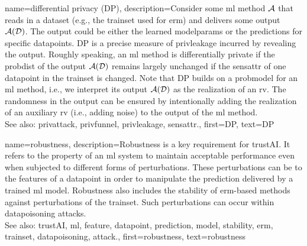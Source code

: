{name={differential privacy (DP)},
  description={Consider some \gls{ml} method $\mathcal{A}$ 
  	that reads in a \gls{dataset} (e.g., the \gls{trainset} 
  	used for \gls{erm}) and delivers some output $\mathcal{A}(\mathcal{D})$. The output 
  	could be either the learned \gls{modelparams} or the \glspl{prediction} for specific \glspl{datapoint}. 
  	DP is a precise measure of \gls{privleakage} incurred by revealing the 
  	output. Roughly speaking, an \gls{ml} method is differentially private if the \gls{probdist} 
  	of the output $\mathcal{A}(\mathcal{D})$ remains largely unchanged if the \gls{sensattr} 
  	of one \gls{datapoint} in the \gls{trainset} is changed. Note that DP 
  	builds on a \gls{probmodel} for an \gls{ml} method, i.e., we interpret its output $\mathcal{A}(\mathcal{D})$ 
  	as the \gls{realization} of an \gls{rv}. The randomness in the output can be ensured 
  	by intentionally adding the \gls{realization} of an auxiliary \gls{rv} (i.e., adding noise) to 
  	the output of the \gls{ml} method.
				\\ 
	See also:  \gls{privattack}, \gls{privfunnel}, \gls{privleakage}, \gls{sensattr}.}, 
  first={DP}, 
  text={DP} 
}

{name={robustness},
	description={Robustness is a key requirement for \gls{trustAI}. It
		refers to the property of an \gls{ml} system to maintain acceptable performance even when 
		subjected to different forms of perturbations. These perturbations can be to the \glspl{feature} 
		of a \gls{datapoint} in order to manipulate the \gls{prediction} delivered by a trained \gls{ml} \gls{model}. 
		Robustness also includes the \gls{stability} of \gls{erm}-based methods against perturbations 
		of the \gls{trainset}. Such perturbations can occur within \gls{datapoisoning} \glspl{attack}. 
		\\ 
		See also: \gls{trustAI}, \gls{ml}, \gls{feature}, \gls{datapoint}, \gls{prediction}, \gls{model}, \gls{stability}, \gls{erm}, \gls{trainset}, \gls{datapoisoning}, \gls{attack}.}, 
	first={robustness}, 
	text={robustness} 
}


